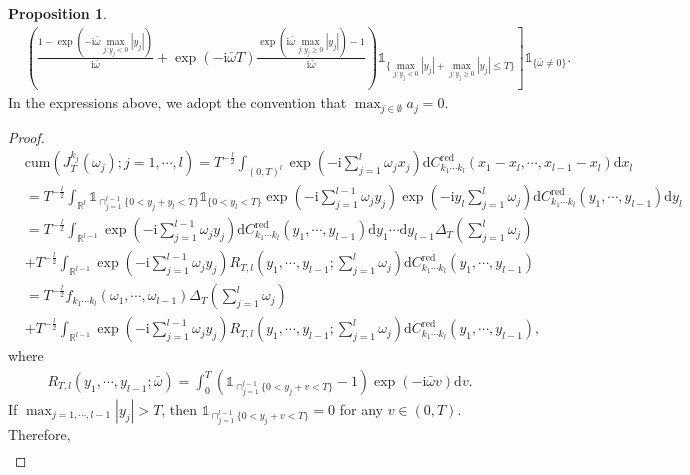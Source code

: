 \documentclass[11pt]{article}
\numberwithin{equation}{section}
\theoremstyle{plain}
\theoremstyle{definition}
\theoremstyle{definition}
\theoremstyle{assumption}
\theoremstyle{proposition}
\newtheorem{proposition}{Proposition}[section]
\theoremstyle{proposition}
\theoremstyle{example}
\theoremstyle{lemma}
\theoremstyle{theorem}
\theoremstyle{remark}
\begin{document}
\begin{proposition}
\begin{align*}
& \left. \left(\frac{1 - \exp(-\mathrm{i}\bar{\omega}\max_{j:y_j<0}|y_j|) }{\mathrm{i}\bar{\omega}} +  \exp(-\mathrm{i}\bar{\omega}T)\frac{\exp(\mathrm{i}\bar{\omega}\max_{j:y_j\geqslant0}|y_j|) - 1 }{\mathrm{i}\bar{\omega}}\right)\mathds{1}_{\{\max_{j:y_j<0}|y_j| + \max_{j:y_j\geqslant0}|y_j|\leqslant T\}} \right]\mathds{1}_{\{\bar{\omega} \neq 0\}} .
\end{align*}
In the expressions above, we adopt the convention that $\max_{j\in\emptyset}a_j = 0$.
\begin{proof}
\begin{align*}
&\mathrm{cum}(J_T^{k_j}(\omega_j);j=1,\cdots,l)
=T^{-\frac{l}{2}}\int_{(0,T)^l} \exp\left(-\mathrm{i}\sum_{j=1}^l\omega_j x_j\right) \mathrm{d}C_{k_1\cdots k_l}^{\mathrm{red}}(x_1 - x_l, \cdots, x_{l-1} - x_{l})\mathrm{d}x_l \\
&=T^{-\frac{l}{2}}\int_{\mathbb{R}^l} \mathds{1}_{\cap_{j=1}^{l-1} \{0< y_j + y_l < T\}} \mathds{1}_{ \{0< y_l < T\}} \exp\left(-\mathrm{i}\sum_{j=1}^{l-1}\omega_j y_j\right) \exp\left(-\mathrm{i}y_l\sum_{j=1}^l\omega_j \right) \mathrm{d}C_{k_1\cdots k_l}^{\mathrm{red}}(y_1, \cdots, y_{l-1})\mathrm{d}y_l \\
&=T^{-\frac{l}{2}}\int_{\mathbb{R}^{l-1}} \exp\left(-\mathrm{i}\sum_{j=1}^{l-1}\omega_j y_j\right) \mathrm{d}C_{k_1\cdots k_l}^{\mathrm{red}}(y_1, \cdots, y_{l-1})\mathrm{d}y_1\cdots\mathrm{d}y_{l-1} \Delta_T\left(\sum_{j=1}^l\omega_j\right) \\
&+T^{-\frac{l}{2}}\int_{\mathbb{R}^{l-1}} \exp\left(-\mathrm{i}\sum_{j=1}^{l-1}\omega_j y_j\right) R_{T,l}(y_1,\cdots,y_{l-1}; \sum_{j=1}^l\omega_j)\mathrm{d}C_{k_1\cdots k_l}^{\mathrm{red}}(y_1, \cdots, y_{l-1}) \\
&=T^{-\frac{l}{2}}f_{k_1\cdots k_l}(\omega_1,\cdots,\omega_{l-1})\Delta_T\left(\sum_{j=1}^l\omega_j\right) \\
&+ T^{-\frac{l}{2}}\int_{\mathbb{R}^{l-1}} \exp\left(-\mathrm{i}\sum_{j=1}^{l-1}\omega_j y_j\right) R_{T,l}(y_1,\cdots,y_{l-1}; \sum_{j=1}^l\omega_j)\mathrm{d}C_{k_1\cdots k_l}^{\mathrm{red}}(y_1, \cdots, y_{l-1}),
\end{align*}
where
\begin{align*}
R_{T,l}(y_1,\cdots,y_{l-1}; \bar{\omega})
=\int_0^T \left(\mathds{1}_{\cap_{j=1}^{l-1} \{0< y_j + v < T\}} - 1 \right)\exp\left(-\mathrm{i}\bar{\omega}v \right)\mathrm{d}v .
\end{align*}
If $\max_{j=1,\cdots,l-1}|y_j|>T$, then $\mathds{1}_{\cap_{j=1}^{l-1} \{0< y_j + v < T\}}=0$ for any $v\in(0,T)$. Therefore,
\begin{align*}

\end{align*}
\end{proof}
\end{proposition}
\end{document}

